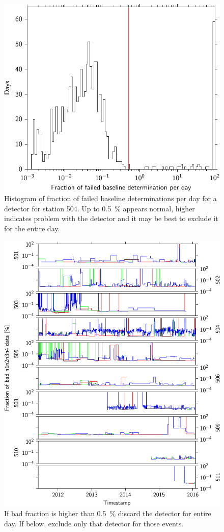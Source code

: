 \begin{figure}
    \centering
    \includegraphics[width=0.7\linewidth]{plots/dataset/histogram_failed_baseline_504_4.pdf}
    \caption{Histogram of fraction of failed baseline determinations per day for a detector for station 504. Up to \SI{0.5}{\percent} appears normal, higher indicates problem with the detector and it may be best to exclude it for the entire day.}
    \label{fig:bad_baseline}
\end{figure}

\begin{figure}
    \centering
    \includegraphics[width=0.7\linewidth]{plots/dataset/bad_fraction_n1n2n3n4.pdf}
    \caption{If bad fraction is higher than \SI{.5}{\percent} discard the detector for entire day. If below, exclude only that detector for those events.}
    \label{fig:bad_n}
\end{figure}

